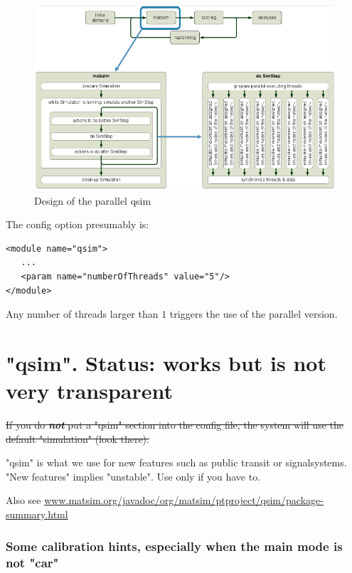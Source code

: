 \begin{figure}[htp]
\includegraphics[width=\textwidth]{figures/qsimParallel/parallelqsim.png}
\caption{Design of the parallel qsim}
\end{figure}

The config option presumably is:
\begin{verbatim}
<module name="qsim">
   ...
   <param name="numberOfThreads" value="5"/>
</module>

\end{verbatim}

Any number of threads larger than $1$ triggers the use of the parallel version.

\vfill\eject
\section{"qsim". Status: works but is not very transparent}

\sout{If you do \textbf{\emph{not}} put a "qsim" section into the config file, the system will use the default "simulation" (look there).}

"qsim"  is what we use for new features such as public transit or  signalsystems. "New features" implies "unstable". Use only  if you have to.

Also see \href{http://www.matsim.org/javadoc/org/matsim/ptproject/qsim/package-summary.html}{www.matsim.org/javadoc/org/matsim/ptproject/qsim/package-summary.html}

\subsubsection{Some calibration hints, especially when the main mode is not "car"}

